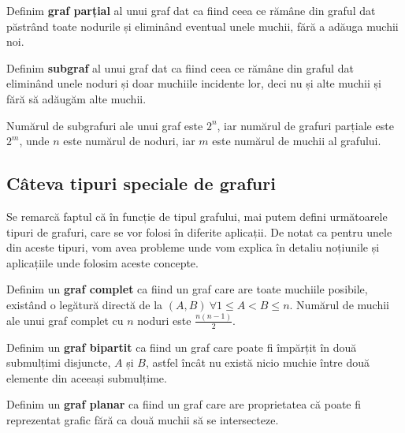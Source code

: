 \begin{definition}
    Definim \textbf{graf parțial} al unui graf dat ca fiind ceea ce rămâne din graful dat păstrând toate nodurile și eliminând eventual unele muchii, fără a adăuga muchii noi.
\end{definition}

\begin{definition}
    Definim \textbf{subgraf} al unui graf dat ca fiind ceea ce rămâne din graful dat eliminând unele noduri și doar muchiile incidente lor, deci nu și alte muchii și fără să adăugăm alte muchii.
\end{definition}

\begin{observation}
    Numărul de subgrafuri ale unui graf este $2^n$, iar numărul de grafuri parțiale este $2^m$, unde $n$ este numărul de noduri, iar $m$ este numărul de muchii al grafului. 
\end{observation}

\subsection{Câteva tipuri speciale de grafuri}

Se remarcă faptul că în funcție de tipul grafului, mai putem defini următoarele tipuri de grafuri, care se vor folosi în diferite aplicații. De notat ca pentru unele din aceste tipuri, vom avea probleme unde vom explica în detaliu noțiunile și aplicațiile unde folosim aceste concepte. 

\begin{definition}
    Definim un \textbf{graf complet} ca fiind un graf care are toate muchiile posibile, existând o legătură directă de la $(A, B)\ \forall{1 \leq A < B \leq n}$. Numărul de muchii ale unui graf complet cu $n$ noduri este $\frac{n(n-1)}{2}$. 
\end{definition}

\begin{definition}
    Definim un \textbf{graf bipartit} ca fiind un graf care poate fi împărțit în două submulțimi disjuncte, $A$ și $B$, astfel încât nu există nicio muchie între două elemente din aceeași submulțime. 
\end{definition}

\begin{definition}
    Definim un \textbf{graf planar} ca fiind un graf care are proprietatea că poate fi reprezentat grafic fără ca două muchii să se intersecteze. 
\end{definition}


